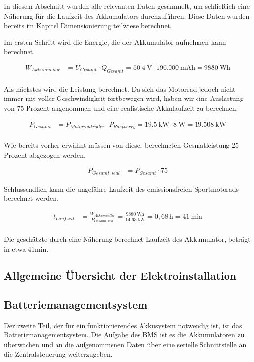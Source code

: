 In diesem Abschnitt wurden alle relevanten Daten gesammelt, um schließlich eine Näherung für die Laufzeit des Akkumulators durchzuführen. Diese Daten wurden bereits im Kapitel Dimensionierung teilwiese berechnet.

Im ersten Schritt wird die Energie, die der Akkumulator aufnehmen kann berechnet.

\begin{align*}
W_{Akkumulator} &= U_{Gesamt} \cdot Q_{Gesamt} = 50.4~\mathrm{V} \cdot 196.000~\mathrm{mAh} = 9880~\mathrm{Wh}\\
\end{align*}

Als nächstes wird die Leistung berechnet. Da sich das Motorrad jedoch nicht immer mit voller Geschwindigkeit fortbewegen wird, haben wir eine Auslastung von 75 Prozent angenommen und eine realistische Akkulaufzeit zu berechnen.

\begin{align*}
P_{Gesamt} &= P_{Motorcontroller} \cdot P_{Raspberry} = 19.5~\mathrm{kW} \cdot 8~\mathrm{W} = 19.508~\mathrm{kW}\\
\end{align*}

Wie bereits vorher erwähnt müssen von dieser berechneten Gesmatleistung 25 Prozent abgezogen werden.

\begin{align*}
P_{Gesamt,real} &= P_{Gesamt} \cdot 75%
\end{align*}

Schlussendlich kann die ungefähre Laufzeit des emissionsfreien Sportmotorads berechnet werden.

\begin{align*}
t_{Laufzeit} &= \frac{W_{Akkumualtor}}{P_{Gesamt,real}} = \frac{9880~\mathrm{Wh}}{14.63~\mathrm{kW}} = 0,68~\mathrm{h} = 41~\mathrm{min}\\
\end{align*}

Die geschätzte durch eine Näherung berechnet Laufzeit des Akkumulator, beträgt in etwa 41min.

\subsection{Allgemeine Übersicht der Elektroinstallation}
\newpage
\subsection{Batteriemanagementsystem}
Der zweite Teil, der für ein funktionierendes Akkusystem notwendig ist, ist das Batteriemanagementsystem. Die Aufgabe des BMS ist es die Akkumulatoren zu überwachen und an die aufgenommenen Daten über eine serielle Schnittstelle an die Zentralsteuerung weiterzugeben. 

